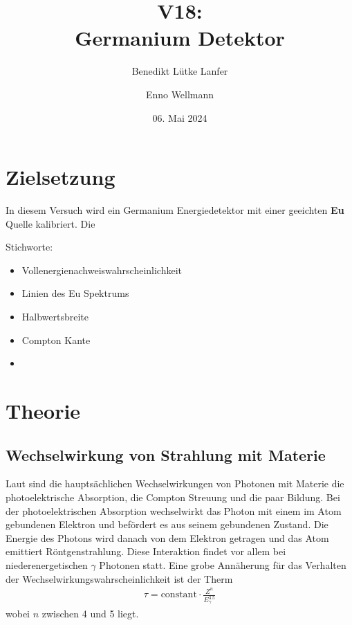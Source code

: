 

\title{V18:\\ Germanium Detektor}
\author{Benedikt Lütke Lanfer \and Enno Wellmann}
\date{06. Mai 2024}
\publishers{TU Dortmund – Fakultät Physik}



\tableofcontents
\newpage

\section{Zielsetzung}
In diesem Versuch wird ein Germanium Energiedetektor mit einer geeichten \textbf{Eu} Quelle kalibriert.
Die

Stichworte:
\begin{itemize}
    \item Vollenergienachweiswahrscheinlichkeit
    \item Linien des Eu Spektrums 
    \item Halbwertsbreite
    \item Compton Kante
    \item 
\end{itemize}




\section{Theorie}
\subsection[]{Wechselwirkung von Strahlung mit Materie}
Laut \cite{book:knoll} sind die hauptsächlichen Wechselwirkungen von Photonen mit Materie die photoelektrische Absorption,
die Compton Streuung und die paar Bildung.
Bei der photoelektrischen  Absorption wechselwirkt das Photon mit einem im Atom gebundenen Elektron und befördert es aus seinem gebundenen Zustand.
Die Energie des Photons wird danach von dem Elektron getragen und das Atom emittiert Röntgenstrahlung.
Diese Interaktion findet vor allem bei niederenergetischen $\gamma$ Photonen statt. 
Eine grobe Annäherung für das Verhalten der Wechselwirkungswahrscheinlichkeit
ist der Therm 
\begin{align}
    \tau = \text{constant} \cdot \frac{Z^n}{E_{\gamma}^{3.5}}
\end{align} %
wobei $n$ zwischen 4 und 5 liegt.

